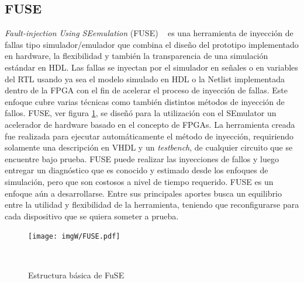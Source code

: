 \documentclass[a4paper,openright,12pt]{report}
\begin{document}
\subsection{FUSE}
\textit{Fault-injection Using SEemulation} (FUSE) ~\cite{Jeitler2009} es una herramienta de inyección de fallas tipo simulador/emulador que combina el diseño del prototipo implementado en hardware, la flexibilidad y también la transparencia de una simulación estándar en HDL. Las fallas se inyectan por el simulador en señales   o en variables del RTL usando ya sea el modelo simulado en HDL o la Netlist implementada dentro de la FPGA con el fin de acelerar el proceso de inyección de fallas.
Este enfoque cubre varias técnicas como también distintos métodos de inyección de fallos. FUSE, ver figura \ref{FuSE}, se diseñó  para la utilización con el  SEmulator{\textregistered}   un acelerador de hardware basado en el concepto de FPGAs. La herramienta creada fue realizada para ejecutar automáticamente el método de inyección, requiriendo solamente una descripción en VHDL y  un   \textit{testbench}, de cualquier circuito que se encuentre bajo prueba. FUSE puede  realizar las inyecciones de fallos y luego entregar un diagnóstico  que es conocido y estimado  desde los enfoques de simulación, pero que son costosos a nivel de tiempo requerido. 
FUSE es un enfoque aún  a desarrollarse. Entre sus principales aportes busca  un equilibrio entre la utilidad y flexibilidad de la herramienta, teniendo que reconfigurarse  para cada dispositivo que se quiera someter a prueba.
 


\begin{figure}[H]
	\centering
	\texttt{[image: imgW/FUSE.pdf]}
	\caption{Estructura básica de FuSE}
     ~\cite{Jeitler2009}
	\label{FuSE}
\end{figure}
\end{document}
